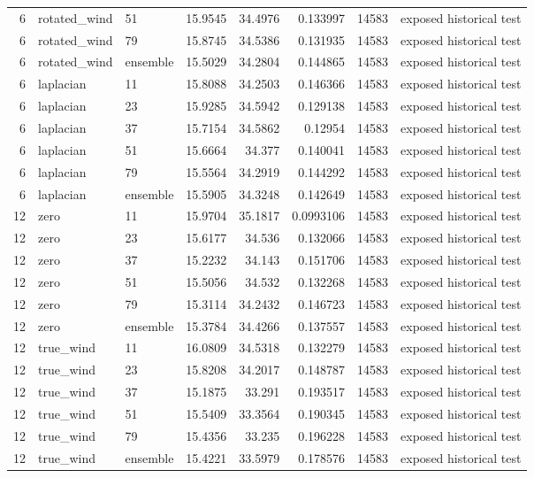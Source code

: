 \begin{tabular}{rllrrrrl}
6 & rotated\_wind & 51 & 15.9545 & 34.4976 & 0.133997 & 14583 & exposed historical test \\
6 & rotated\_wind & 79 & 15.8745 & 34.5386 & 0.131935 & 14583 & exposed historical test \\
6 & rotated\_wind & ensemble & 15.5029 & 34.2804 & 0.144865 & 14583 & exposed historical test \\
6 & laplacian & 11 & 15.8088 & 34.2503 & 0.146366 & 14583 & exposed historical test \\
6 & laplacian & 23 & 15.9285 & 34.5942 & 0.129138 & 14583 & exposed historical test \\
6 & laplacian & 37 & 15.7154 & 34.5862 & 0.12954 & 14583 & exposed historical test \\
6 & laplacian & 51 & 15.6664 & 34.377 & 0.140041 & 14583 & exposed historical test \\
6 & laplacian & 79 & 15.5564 & 34.2919 & 0.144292 & 14583 & exposed historical test \\
6 & laplacian & ensemble & 15.5905 & 34.3248 & 0.142649 & 14583 & exposed historical test \\
12 & zero & 11 & 15.9704 & 35.1817 & 0.0993106 & 14583 & exposed historical test \\
12 & zero & 23 & 15.6177 & 34.536 & 0.132066 & 14583 & exposed historical test \\
12 & zero & 37 & 15.2232 & 34.143 & 0.151706 & 14583 & exposed historical test \\
12 & zero & 51 & 15.5056 & 34.532 & 0.132268 & 14583 & exposed historical test \\
12 & zero & 79 & 15.3114 & 34.2432 & 0.146723 & 14583 & exposed historical test \\
12 & zero & ensemble & 15.3784 & 34.4266 & 0.137557 & 14583 & exposed historical test \\
12 & true\_wind & 11 & 16.0809 & 34.5318 & 0.132279 & 14583 & exposed historical test \\
12 & true\_wind & 23 & 15.8208 & 34.2017 & 0.148787 & 14583 & exposed historical test \\
12 & true\_wind & 37 & 15.1875 & 33.291 & 0.193517 & 14583 & exposed historical test \\
12 & true\_wind & 51 & 15.5409 & 33.3564 & 0.190345 & 14583 & exposed historical test \\
12 & true\_wind & 79 & 15.4356 & 33.235 & 0.196228 & 14583 & exposed historical test \\
12 & true\_wind & ensemble & 15.4221 & 33.5979 & 0.178576 & 14583 & exposed historical test \\

\end{tabular}
